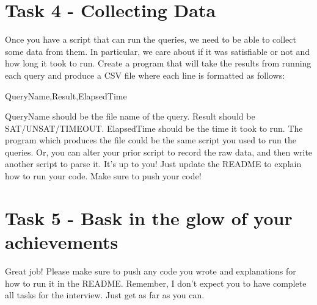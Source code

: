 \documentclass{article}
\begin{document}
\section*{Task 4 - Collecting Data}
Once you have a script that can run the queries, we need to be able to collect some data from them. In particular, we care about if it was satisfiable or not and how long it took to run.
Create a program that will take the results from running each query and produce a CSV file where each line is formatted as follows:

\vspace{2mm}
\noindent
QueryName,Result,ElapsedTime
\vspace{2mm}

\noindent
QueryName should be the file name of the query.
Result should be SAT/UNSAT/TIMEOUT.
ElapsedTime should be the time it took to run.
The program which produces the file could be the same script you used to run the queries. 
Or, you can alter your prior script to record the raw data, and then write another script to parse it. It's up to you!
Just update the README to explain how to run your code.
Make sure to push your code!

\section*{Task 5 - Bask in the glow of your achievements}
Great job! Please make sure to push any code you wrote and explanations for how to run it in the README. Remember, I don't expect you to have complete all tasks for the interview. Just get as far as you can.
\end{document}
